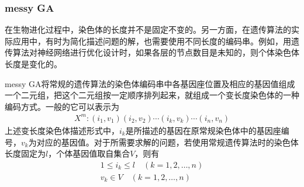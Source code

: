         \subsubsection{messy GA}
            \par
            在生物进化过程中，染色体的长度并不是固定不变的。另一方面，在遗传算法的实际应用中，有时为简化描述问题的解，也需要使用不同长度的编码串。例如，用遗传算法对神经网络进行优化设计时，如果各层的节点数目是未知的，则个体染色体长度是变化的。
            \par
            messy GA将常规的遗传算法的染色体编码串中各基因座位置及相应的基因值组成一个二元组，把这个二元组按一定顺序排列起来，就组成一个变长度染色体的一种编码方式。一般的它可以表示为
            \begin{align*}
            X^m:(i_1,v_1)(i_2,v_2)\cdots (i_k,v_k)\cdots (i_n,v_n)
            \end{align*}
            上述变长度染色体描述形式中，$i_k$是所描述的基因在原常规染色体中的基因座编号，$v_k$为对应的基因值。对于所需要求解的问题，若使用常规遗传算法时的染色体长度固定为$l$，个体基因值取自集合$V$，则有
            \begin{align*}
            1 \leqslant i_k \leqslant l\quad (k=1,2,\dots,n)\\
            v_k\in V\quad (k=1,2,\dots,n)
            \end{align*}

